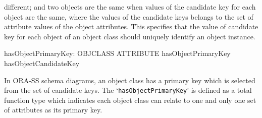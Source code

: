 \documentclass{entcs}
\begin{document}
different; and two objects are the same when values of the
candidate key for each object are the same, where the values of
the candidate keys belongs to the set of attribute values of the
object attributes. This specifies that the value of candidate key
for each object of an object class should uniquely identify an
object instance.
\begin{small}
\begin{axdef}
  hasObjectPrimaryKey: OBJCLASS \fun  \power  ATTRIBUTE
\where
  hasObjectPrimaryKey \subseteq  hasObjectCandidateKey
\end{axdef}
\end{small}
In ORA-SS schema diagrams, an object class has a primary key which
is selected from the set of candidate keys. The
`\texttt{hasObjectPrimaryKey}' is defined as a total function type
which indicates each object class can relate to one and only one
set of attributes as its primary key.
\end{document}
